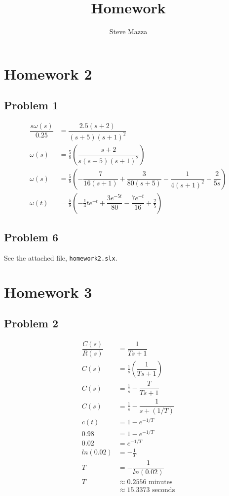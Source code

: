 \documentclass[letterpaper,10pt]{article}
\title{Homework}
\author{Steve Mazza}
\begin{document}
\maketitle

\section*{Homework 2}
\subsection*{Problem 1}
\begin{align*}
	\dfrac{s\omega(s)}{0.25} &= \dfrac{2.5(s+2)}{(s+5)(s+1)^2} \\
	\omega(s) &= \frac{5}{8}\left(\dfrac{s+2}{s(s+5)(s+1)^2}\right) \\
	\omega(s) &= \frac{5}{8}\left(-\dfrac{7}{16(s+1)} + \dfrac{3}{80(s+5)} - \dfrac{1}{4(s+1)^2}+ \dfrac{2}{5s}\right) \\
	\omega(t) &= \frac{5}{8}\left(-\frac{1}{4}te^{-t} + \dfrac{3e^{-5t}}{80} - \dfrac{7e^{-t}}{16} + \frac{2}{5}\right)
\end{align*}

\subsection*{Problem 6}
See the attached file, \texttt{homework2.slx}.

\section*{Homework 3}
\subsection*{Problem 2}
\begin{align*}
	\dfrac{C(s)}{R(s)} &= \dfrac{1}{Ts+1} \\
	C(s) &= \frac{1}{s}\left(\dfrac{1}{Ts+1}\right) \\
	C(s) &= \frac{1}{s} - \dfrac{T}{Ts+1} \\
	C(s) &= \frac{1}{s} - \dfrac{1}{s+(1/T)} \\
	c(t) &= 1 - e^{-1/T} \\
	0.98 &= 1 - e^{-1/T} \\
	0.02 &= e^{-1/T} \\
	ln(0.02) &= -\frac{1}{T} \\
	T &= -\dfrac{1}{ln(0.02)} \\
	T &\approx 0.2556 \mbox{\ minutes} \\
	&\approx 15.3373 \mbox{\ seconds}
\end{align*}
\end{document}
